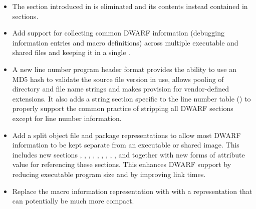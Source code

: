 \begin{itemize}
\item The \dotdebugtypes{}
section introduced in \DWARFVersionIV{} 
is eliminated and its contents instead contained in \dotdebuginfo{} sections.
\item Add support for collecting common DWARF information 
(debugging information entries and macro definitions)
across multiple executable and shared files and keeping it in a single
.
\item A new line number program header format 
provides the ability to use an MD5 hash to validate 
the source file version in use, allows pooling 
of directory and file name strings and makes provision for vendor-defined
extensions. It also adds a string section specific to the line number table 
(\dotdebuglinestr)
to properly support the common practice of stripping all DWARF sections
except for line number information.
\item Add a split object file and package representations to allow most 
DWARF information to be kept separate from an executable 
or shared image. This includes new sections 
\dotdebugaddr, \dotdebugstroffsets, \dotdebugabbrevdwo, \dotdebuginfodwo, 
\dotdebuglinedwo, \dotdebugloclistsdwo, \dotdebugmacrodwo, \dotdebugstrdwo,
\dotdebugstroffsetsdwo, \dotdebugcuindex{} and \dotdebugtuindex{} 
together with new forms of attribute value for referencing these sections.
This enhances DWARF support by reducing executable program size and
by improving link times.
\item Replace the \dotdebugmacinfo{} macro information representation with
with a \dotdebugmacro{} representation that can potentially be much more compact.


\end{itemize}
